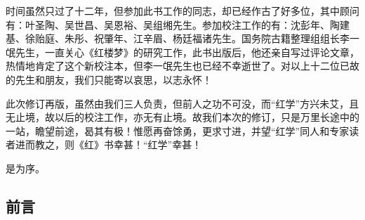 \par 时间虽然只过了十二年，但参加此书工作的同志，却已经作古了好多位，其中顾问有：叶圣陶、吴世昌、吴恩裕、吴组缃先生。参加校注工作的有：沈彭年、陶建基、徐贻庭、朱彤、祝肇年、江辛眉、杨廷福诸先生。国务院古籍整理组组长李一氓先生，一直关心《红楼梦》的研究工作，此书出版后，他还亲自写过评论文章，热情地肯定了这个新校注本，但李一氓先生也已经不幸逝世了。对以上十二位已故的先生和朋友，我们只能寄以哀思，以志永怀！
\par 此次修订再版，虽然由我们三人负责，但前人之功不可没，而“红学”方兴未艾，且无止境，故以后的校注工作，亦无有止境。故我们本次的修订，只是万里长途中的一站，瞻望前途，曷其有极！惟愿再奋馀勇，更求寸进，并望“红学”同人和专家读者进而教之，则《红》书幸甚！“红学”幸甚！
\par 是为序。
\par {}


\subsection*{前言}


